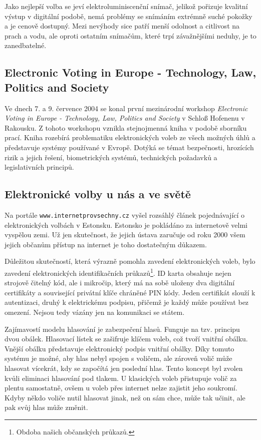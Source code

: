 \documentclass[11pt,twoside,a4paper]{book}
\begin{document}
Jako nejlepší volba se jeví elektroluminiscenční snímač, jelikož pořizuje kvalitní výstup v digitální podobě, nemá problémy se snímáním extrémně suché pokožky a je cenově dostupný. Mezi nevýhody sice patří menší odolnost a citlivost na prach a vodu, ale oproti ostatním snímačům, které trpí závažnějšími neduhy, je to zanedbatelné.

\subsection{Electronic Voting in Europe - Technology, Law, Politics and Society}

Ve dnech 7. a 9. července 2004 se konal první mezinárodní workshop \textit{Electronic Voting in Europe - Technology, Law, Politics and Society} \cite{book:prosser} v Schloß Hofenenu v Rakousku. Z tohoto workshopu vznikla stejnojmenná kniha v podobě sborníku prací. Kniha rozebírá problematiku elektronických voleb ze všech možných úhlů a představuje systémy používané v Evropě. Dotýká se témat bezpečnosti, hrozících rizik a jejich řešení, biometrických systémů, technických požadavků a legislativních principů.

\subsection{Elektronické volby u nás a ve světě}

Na portále \texttt{www.internetprovsechny.cz} vyšel rozsáhlý článek \cite{www:estonsko} pojednávající o elektronických volbách v Estonsku. Estonsko je pokládáno za internetově velmi vyspělou zemi. Už jen skutečnost, že jejich ústava zaručuje od roku 2000 všem jejich občanům přístup na internet je toho dostatečným důkazem.

Důležitou skutečností, která výrazně pomohla zavedení elektronických voleb, bylo zavedení elektronických identifikačních průkazů\footnote{Obdoba našich občanských průkazů.}. ID karta obsahuje nejen strojově čitelný kód, ale i mikročip, který má na sobě uloženy dva digitální certifikáty a související privátní klíče chráněné PIN kódy. Jeden certifikát slouží k autentizaci, druhý k elektrickému podpisu, přičemž je každý může používat bez omezení. Nejsou tedy vázány jen na komunikaci se státem.

Zajímavostí modelu hlasování je zabezpečení hlasů. Funguje na tzv. principu dvou obálek. Hlasovací lístek se zašifruje klíčem voleb, což tvoří vnitřní obálku. Vnější obálku představuje elektronický podpis vnitřní obálky. Díky tomuto systému je možné, aby hlas nebyl spojen s voličem, ale zároveň volič může hlasovat vícekrát, kdy se započítá jen poslední hlas. Tento koncept byl zvolen kvůli eliminaci hlasování pod tlakem. U klasických voleb přistupuje volič za plentu samostatně, ovšem u voleb přes internet nelze zajistit jeho soukromí. Kdyby někdo voliče nutil hlasovat jinak, než on sám chce, může tak učinit, ale pak svůj hlas může změnit.
\end{document}
